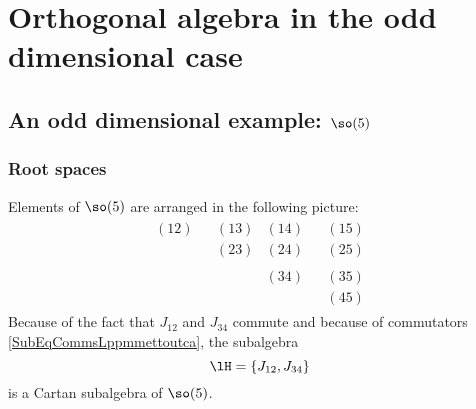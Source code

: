 \section{Orthogonal algebra in the odd dimensional case}

\subsection{An odd dimensional example: \texorpdfstring{$\so(5)$}{so5}}
\label{SubSecsocinq}

\subsubsection{Root spaces}

Elements of $\so(5)$ are arranged in the following picture:
\begin{equation}
	\begin{matrix}
		\begin{matrix}
			(12)\\\phantom{(12)}
		\end{matrix}
		&
		\boxed{
		\begin{matrix}
			(13)&(14)\\
			(23)&(24)
		\end{matrix}
		}
		&
		\boxed{
		\begin{matrix}
			(15)\\
			(25)
		\end{matrix}
		}
		\\
		\begin{matrix}
			\phantom{(12)}\\\phantom{(33)}
		\end{matrix}
		&
		\begin{matrix}
			\phantom{(12)}&(34)\\\phantom{(45)}
		\end{matrix}
		&
		\boxed{
		\begin{matrix}
			(35)\\
			(45)
		\end{matrix}
		}
	\end{matrix}
\end{equation}
Because of the fact that $J_{12}$ and $J_{34}$ commute and because of commutators \eqref{SubEqCommsLppmmettoutca}, the subalgebra
\begin{equation}
	\lH=\{ J_{12},J_{34} \}
\end{equation}
is a Cartan subalgebra of $\so(5)$.

